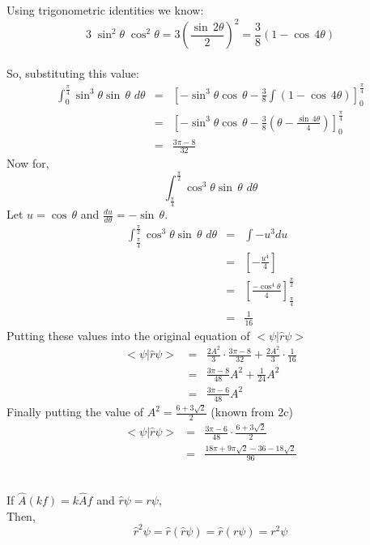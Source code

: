 \documentclass{article}
\begin{document}
{Using trigonometric identities we know:\\
$$3\;\sin^2\theta\;\cos^2\theta =3\left(\frac{\sin\, 2\theta}{2}\right)^2= \frac{3}{8}(1-\cos\, 4\theta)$$\\
So, substituting this value:
\begin{eqnarray*}
        \int_{0}^{\frac{\pi}{4}} \sin^3\theta \sin\,\theta  \,\,d\theta &=& [-\sin^3\theta \cos \,\theta -  \frac{3}{8}\int(1-\cos\, 4\theta)]_{0}^{\frac{\pi}{4}}\\
        &=&[-\sin^3\theta \cos \,\theta -  \frac{3}{8}(\theta -\frac{\sin\,4\theta}{4})]_{0}^{\frac{\pi}{4}}\\
        &=&\frac{3\pi-8}{32}
\end{eqnarray*}
Now for,
$$\int_{\frac{\pi}{4}}^{\frac{\pi}{2}} \cos^3\theta \sin\,\theta  \,\,d\theta$$
Let $u=\cos\,\theta$ and $\frac{du}{d\theta} = -\sin\,\theta$.
\begin{eqnarray*}
        \int_{\frac{\pi}{4}}^{\frac{\pi}{2}} \cos^3\theta \sin\,\theta  \,\,d\theta &=&  \int -u^3 du\\
        &=&[-\frac{u^4}{4}]\\
        &=&[\frac{-\cos^4\theta}{4}]_{\frac{\pi}{4}}^{\frac{\pi}{2}} \\
        &=&\frac{1}{16}
\end{eqnarray*}
Putting these values into the original equation of $<\psi|\hat{r}\psi>$
\begin{eqnarray*}
    <\psi|\hat{r}\psi> \,&=&  \frac{2A^2 }{3}\cdot \frac{3\pi-8}{32} + \frac{ 2A^2 }{3}\cdot \frac{1}{16} \\
    &=&\frac{3\pi-8}{48}A^2+\frac{1}{24}A^2\\
    &=& \frac{3\pi-6}{48} A^2
\end{eqnarray*}
Finally putting the value of $A^2 = \frac{6+3\sqrt{2}}{2}$ (known from 2c)
\begin{eqnarray*}
    <\psi|\hat{r}\psi> &=&\frac{3\pi-6}{48}\cdot\frac{6+3\sqrt{2}}{2}\\
    &=&\frac{18\pi + 9\pi\sqrt{2}-36-18\sqrt{2}}{96}\\
\end{eqnarray*}
}


\subsection{}%
\large{
If $\hat{A}(kf) = k\hat{A}f$ and $\hat{r}\psi = r\psi$, \\
Then, \\
$$\hat{r}^2\psi = \hat{r}(\hat{r}\psi) = \hat{r}(r\psi) = r^2\psi$$
}
\end{document}

